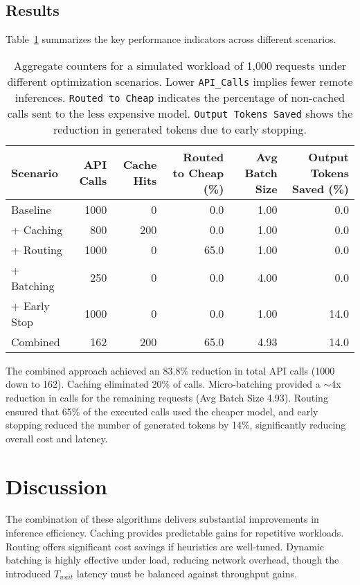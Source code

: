 \documentclass[11pt]{article}
\begin{document}
\subsection{Results}
Table~\ref{tab:results} summarizes the key performance indicators across different scenarios.

\begin{table}[h]
\centering
\begin{tabular}{lrrrrr}
\toprule
Scenario & API Calls & Cache Hits & Routed to Cheap (\%) & Avg Batch Size & Output Tokens Saved (\%) \\
\midrule
Baseline & 1000 & 0 & 0.0 & 1.00 & 0.0 \\
+ Caching & 800 & 200 & 0.0 & 1.00 & 0.0 \\
+ Routing & 1000 & 0 & 65.0 & 1.00 & 0.0 \\
+ Batching & 250 & 0 & 0.0 & 4.00 & 0.0 \\
+ Early Stop & 1000 & 0 & 0.0 & 1.00 & 14.0 \\
Combined & 162 & 200 & 65.0 & 4.93 & 14.0 \\
\bottomrule
\end{tabular}
\caption{Aggregate counters for a simulated workload of 1,000 requests under different optimization scenarios. Lower \texttt{API\_Calls} implies fewer remote inferences. \texttt{Routed to Cheap} indicates the percentage of non-cached calls sent to the less expensive model. \texttt{Output Tokens Saved} shows the reduction in generated tokens due to early stopping.}
\label{tab:results}
\end{table}

The combined approach achieved an 83.8\% reduction in total API calls (1000 down to 162). Caching eliminated 20\% of calls. Micro-batching provided a $\sim$4x reduction in calls for the remaining requests (Avg Batch Size 4.93). Routing ensured that 65\% of the executed calls used the cheaper model, and early stopping reduced the number of generated tokens by 14\%, significantly reducing overall cost and latency.

\section{Discussion}
The combination of these algorithms delivers substantial improvements in inference efficiency. Caching provides predictable gains for repetitive workloads. Routing offers significant cost savings if heuristics are well-tuned. Dynamic batching is highly effective under load, reducing network overhead, though the introduced $T_{wait}$ latency must be balanced against throughput gains.
\end{document}
